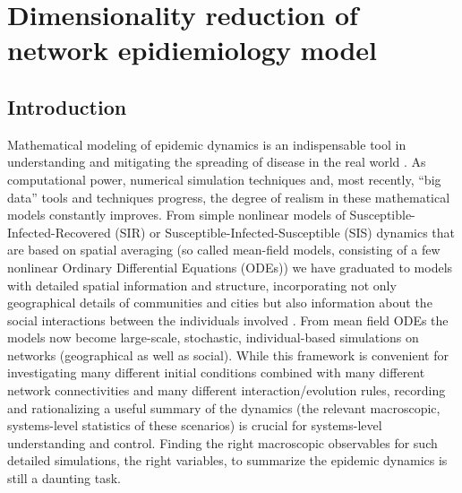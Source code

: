 \chapter{Dimensionality reduction of network epidiemiology
  model \label{ch:sis}}

\section{Introduction}

Mathematical modeling of epidemic dynamics is an indispensable tool in
understanding and mitigating the spreading of disease in the real
world
\cite{gross_epidemic_2006,pastor-satorras_epidemic_2015,segbroeck_adaptive_2010,zhou_epidemic_2012}.
As computational power, numerical simulation techniques and, most
recently, “big data” tools and techniques progress, the degree of
realism in these mathematical models constantly improves. From simple
nonlinear models of Susceptible-Infected-Recovered (SIR) or
Susceptible-Infected-Susceptible (SIS) dynamics that are based on
spatial averaging (so called mean-field models, consisting of a few
nonlinear Ordinary Differential Equations (ODEs)) we have graduated to
models with detailed spatial information and structure, incorporating
not only geographical details of communities and cities but also
information about the social interactions between the individuals
involved
\cite{colizza_modeling_2006,wang_epidemic_2011,eubank_modelling_2004}.
From mean field ODEs the models now become large-scale, stochastic,
individual-based simulations on networks (geographical as well as
social).  While this framework is convenient for investigating many
different initial conditions combined with many different network
connectivities and many different interaction/evolution rules,
recording and rationalizing a useful summary of the dynamics (the
relevant macroscopic, systems-level statistics of these scenarios) is
crucial for systems-level understanding and control. Finding the right
macroscopic observables for such detailed simulations, the right
variables, to summarize the epidemic dynamics is still a daunting
task.

